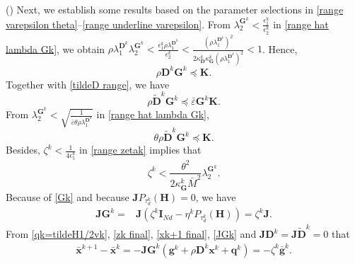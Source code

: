 \documentclass[12pt,draftcls,onecolumn]{IEEEtran}
\newcommand{\bG}{{\mathbf{G}}}
\newcommand{\bK}{{\mathbf{K}}}
\newcommand{\bD}{{\mathbf{D}}}
\begin{document}
() Next, we establish some results based on the parameter selections in  \eqref{range varepsilon theta}--\eqref{range underline varepsilon}. From $\lambda_{2}^{\mathbf{G}^k}<\frac{\epsilon_1^k}{\epsilon_2^k}$ in \eqref{range hat lambda Gk}, we obtain $ \rho \lambda_1^{\mathbf{D}^k}\lambda_2^{\mathbf{G}^k}<\frac{\epsilon_1^k\rho \lambda_1^{\mathbf{D}^k}}{\epsilon_2^k} < \frac{(\rho\lambda_1^{\mathbf{D}^k})^2}{2\kappa_{\mathbf{D}}^k\kappa_{\mathbf{G}}^k(\rho\lambda_1^{\mathbf{D}^k})^2}<1$. Hence,
	\begin{equation}
		\label{rhoDkGk} \rho \mathbf{D}^k \mathbf{G}^k \preceq \mathbf{K}.
	\end{equation}
    Together with \eqref{tildeD range}, we have
    \begin{equation}\label{rho tildeDk Gk preceq}
        \rho\tilde{\bD}^k\bG^k\preceq \bar{\varepsilon} \bG^k\mathbf{K}.
    \end{equation}
	From $\lambda_{2}^{\mathbf{G}^k}<\sqrt{\frac{1}{\bar{\varepsilon}\theta\rho\lambda_{1}^{\mathbf{D}^k}}}$ in \eqref{range hat lambda Gk}, 
	\begin{equation}
		\label{theta rho tildeDk Gk} \theta\rho\tilde{\mathbf{D}}^k\bG^k \preceq \mathbf{K}.
	\end{equation}
	Besides, $\zeta^k<\frac{1}{4\epsilon_5^k}$ in \eqref{range zetak} implies that
	\begin{equation}
		\label{zetak leq theta2} {\zeta^k}<\frac{\theta^2}{2\kappa_{\mathbf{G}}^k\bar{M}^2}\lambda_{2}^{\mathbf{G}^k}.
	\end{equation}
Because of \eqref{Gk} and because $\mathbf{J}P_{\tau_d^k}(\mathbf{H})=0$, we have
	\begin{align}
		\mathbf{J}\mathbf{G}^k = & \mathbf{J}(\zeta^k \mathbf{I}_{Nd}-\eta^k P_{\tau_d^k}(\mathbf{H}))=\zeta^k \mathbf{J}. \label{JGk}
	\end{align}
From \eqref{qk=tildeH1/2vk}, \eqref{zk final}, \eqref{xk+1 final}, \eqref{JGk} and $\mathbf{J}\mathbf{D}^k=\mathbf{J}\tilde{\mathbf{D}}^k=0$ that 
\begin{align}
	\bar{\mathbf{x}}^{k+1} - \bar{\mathbf{x}}^k = -\mathbf{J} \mathbf{G}^k(\mathbf{g}^k + \rho \mathbf{D}^k \mathbf{x}^k + \mathbf{q}^k) = - {\zeta^k}\bar{\mathbf{g}}^k. \label{bar xk+1 - bar xk}
\end{align}
\end{document}

